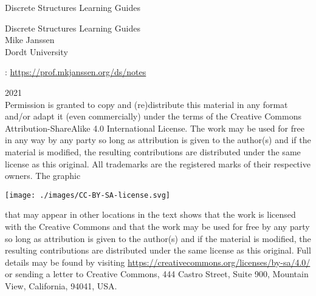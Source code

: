 \documentclass[oneside,10pt,]{book}
\newcommand{\titlepagefont}{\relax}
\numberwithin{equation}{section}
\begin{document}
\frontmatter
\thispagestyle{empty}
{\titlepagefont\centering
\vspace*{0.28\textheight}
{\Huge Discrete Structures Learning Guides}\\}
\clearpage
\thispagestyle{empty}
{\titlepagefont\centering
\vspace*{0.14\textheight}
{\Huge Discrete Structures Learning Guides}\\[3\baselineskip]
{\Large Mike Janssen}\\[0.5\baselineskip]
{\Large Dordt University}\\}
\clearpage
\thispagestyle{empty}
\hypertarget{g:colophon:idm197256095520}{}
: \href{https:\slash{}\slash{}prof.mkjanssen.org\slash{}ds\slash{}notes}{https:\slash{}\slash{}prof.mkjanssen.org\slash{}ds\slash{}notes}\par\medskip
\noindent\textcopyright{}2021\textendash{}\quad{}\\[0.5\baselineskip]
Permission is granted to copy and (re)distribute this material in any format and\slash{}or adapt it (even commercially) under the terms of the Creative Commons Attribution-ShareAlike 4.0 International License.  The work may be used for free in any way by any party so long as attribution is given to the author(s) and if the material is modified, the resulting contributions are distributed under the same license as this original.  All trademarks\texttrademark{} are the registered\textregistered{} marks of their respective owners. The graphic \begin{sidebyside}{1}{0.375}{0.375}{0}%
\begin{sbspanel}{0.25}%
\texttt{[image: ./images/CC-BY-SA-license.svg]}
\end{sbspanel}%
\end{sidebyside}%
 that may appear in other locations in the text shows that the work is licensed with the Creative Commons and that the work may be used for free by any party so long as attribution is given to the author(s) and if the material is modified, the resulting contributions are distributed under the same license as this original. Full details may be found by visiting \href{https://creativecommons.org/licenses/by-sa/4.0/}{https:\slash{}\slash{}creativecommons.org\slash{}licenses\slash{}by-sa\slash{}4.0\slash{}}  or sending a letter to Creative Commons, 444 Castro Street, Suite 900, Mountain View, California, 94041, USA.\par\medskip
\end{document}
